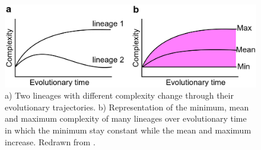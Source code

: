 \begin{figure}[t]
  \includegraphics[width=12cm]{./Images/complexity_min.jpeg}
  \centering
  \caption{a) Two lineages with different complexity change through their evolutionary trajectories.
  b) Representation of the minimum, mean and maximum complexity of many lineages over evolutionary time in which the minimum stay constant while the mean and maximum increase.
Redrawn from \citep{Arthur2010}.
 }
  \label{fig:Complexity_min}
\end{figure}

%
%
%
%
% 

